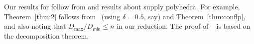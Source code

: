 %
Our results for \mckc follow from  and results about supply polyhedra.
For example, Theorem~\ref{thm:2} follows from~ (using $\delta=0.5$, say) and Theorem~\ref{thm:conflp}, and also noting that $D_\mathrm{max}/D_\mathsf{min} \leq n$ in our reduction. The proof of ~ is based on the decomposition theorem. 

